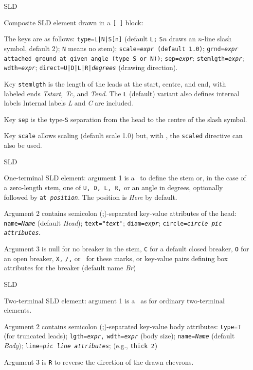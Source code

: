   {SLD}
  {Composite SLD element drawn in a {\tt [ ]} block:

   The keys are as follows:
   {\tt type=L|N|S[n]} (default {\tt L;} {\tt S$n$} draws an $n$-line slash
     symbol, default 2); {\tt N} means no stem);
   {\tt scale={\sl expr} (default 1.0)};
   {\tt grnd={\sl expr} attached ground at given angle
     (type {\tt S} or {\tt N}))};
   {\tt sep={\sl{}expr}};
   {\tt stemlgth={\sl{}expr}};
   {\tt wdth={\sl{}expr}};
   {\tt direct=U|D|L|R|{\sl degrees}} (drawing direction).

   Key {\tt stemlgth} is the length of the leads at the start, centre, and end,
     with labeled ends {\sl Tstart, Tc,} and {\sl Tend}.
     The {\tt L} (default) variant also defines internal labels
     Internal labels {\sl L} and {\sl C} are included.

   Key {\tt sep} is the type-{\tt S} separation from the head to the centre
     of the slash symbol.

   Key {\tt scale} allows scaling (default scale 1.0) but, with \dpic,
     the {\tt scaled} directive can also be used.
   }
  {SLD}
  {One-terminal SLD element: argument 1 is a \linespec\ to define the stem
   or, in the case of a zero-length stem, one of {\tt U, D, L, R,} or an
   angle in degrees, optionally followed by {\tt at {\sl position}}.
   The position is {\sl Here} by default.

   Argument 2 contains semicolon (;)-separated key-value attributes
   of the head:
   {\tt name={\sl{}Name}} (default {\sl Head});
   {\tt text="{\sl{}text}"};
   {\tt diam={\sl{}expr}};
   {\tt circle={\sl{}circle pic attributes}}.

   Argument 3 is null for no breaker in the stem, {\tt C} for a default
   closed breaker, {\tt O} for an open breaker, {\tt X,} {\tt /,} or \bsl\ for
   these marks, or
   key-value pairs defining box attributes for the breaker
   (default name {\sl Br})
   \label{sl_disk}%
   }
  {SLD}
  {Two-terminal SLD element: argument 1 is a \linespec\ as for ordinary
   two-terminal elements.

   Argument 2 contains semicolon (;)-separated key-value body attributes:
   {\tt type=T} (for truncated leads);
   {\tt lgth={\sl{}expr},}
   {\tt wdth={\sl{}expr}} (body size);
   {\tt name={\sl{}Name}} (default {\sl Body});
   {\tt line={\sl{}pic line attributes}}; (e.g., {\tt thick 2})

   Argument 3 is {\tt R} to reverse the direction of the drawn chevrons.
   }
